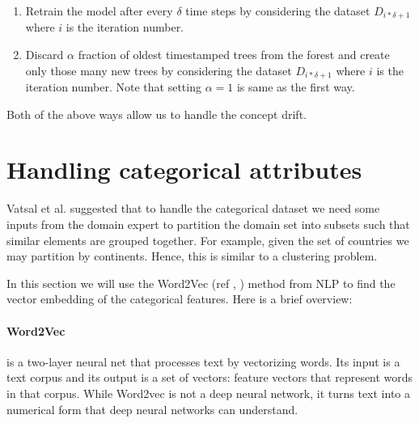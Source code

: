 \begin{enumerate}
    \item Retrain the model after every $\delta$ time steps by considering the dataset $D_{i * \delta + 1}$ where $i$ is the iteration number.
    \item Discard $\alpha$ fraction of oldest timestamped trees from the forest and create only those many new trees by considering the dataset $D_{i * \delta + 1}$ where $i$ is the iteration number.
    Note that setting $\alpha = 1$ is same as the first way.
\end{enumerate}

Both of the above ways allow us to handle the concept drift. 

\pagebreak


\section{Handling categorical attributes}
\label{sec:handling-categorical-attributes}

Vatsal et al. \cite{NIPS2019_9710} suggested that to handle the categorical dataset we need some inputs from the domain expert to partition the domain set into subsets such that similar elements are grouped together.
For example, given the set of countries we may partition by continents.
Hence, this is similar to a clustering problem.

In this section we will use the Word2Vec (ref \cite{41224}, \cite{NIPS2013_5021}) method from NLP to find the vector embedding of the categorical features.
Here is a brief overview:

\paragraph{Word2Vec} is a two-layer neural net that processes text by vectorizing words.
Its input is a text corpus and its output is a set of vectors: feature vectors that represent words in that corpus.
While Word2vec is not a deep neural network, it turns text into a numerical form that deep neural networks can understand.

